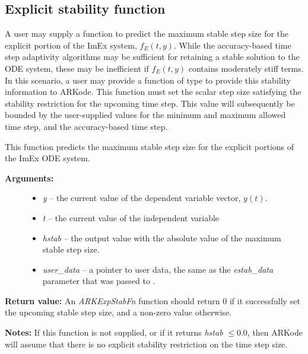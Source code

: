 \documentclass[letterpaper,10pt,english]{sphinxmanual}
\begin{document}
\subsection{Explicit stability function}
\label{c_interface/User_supplied:explicit-stability-function}\label{c_interface/User_supplied:cinterface-stabilityfn}
A user may supply a function to predict the maximum stable step size
for the explicit portion of the ImEx system, $f_E(t,y)$.  While
the accuracy-based time step adaptivity algorithms may be sufficient
for retaining a stable solution to the ODE system, these may be
inefficient if $f_E(t,y)$ contains moderately stiff terms.  In
this scenario, a user may provide a function of type {\hyperref[c_interface/User_supplied:ARKExpStabFn]{}}
to provide this stability information to ARKode.  This function
must set the scalar step size satisfying the stability restriction for
the upcoming time step.  This value will subsequently be bounded by
the user-supplied values for the minimum and maximum allowed time
step, and the accuracy-based time step.

\begin{fulllineitems}
\label{c_interface/User_supplied:ARKExpStabFn}
This function predicts the maximum stable step size for the
explicit portions of the ImEx ODE system.
\begin{description}
\item[{\textbf{Arguments:}}] \leavevmode\begin{itemize}
\item {} 
\emph{y} -- the current value of the dependent variable vector, $y(t)$.

\item {} 
\emph{t} -- the current value of the independent variable

\item {} 
\emph{hstab} -- the output value with the absolute value of the
maximum stable step size.

\item {} 
\emph{user\_data} -- a pointer to user data, the same as the
\emph{estab\_data} parameter that was passed to {\hyperref[c_interface/User_callable:ARKodeSetStabilityFn]{}}.

\end{itemize}

\end{description}

\textbf{Return value:}
An \emph{ARKExpStabFn} function should return 0 if it
successfully set the upcoming stable step size, and a non-zero
value otherwise.

\textbf{Notes:}  If this function is not supplied, or if it returns
\emph{hstab} $\le 0.0$, then ARKode will assume that there is no explicit
stability restriction on the time step size.

\end{fulllineitems}
\end{document}
